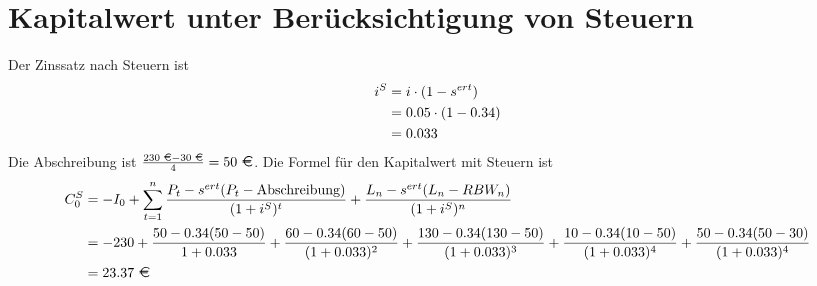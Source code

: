 \documentclass{article}
\begin{document}
	\section*{Kapitalwert unter Berücksichtigung von Steuern}
	Der Zinssatz nach Steuern ist
	\begin{align}
		i^S &= i\cdot (1-s^{ert}) \notag \\
		&= 0.05 \cdot (1-0.34) \notag \\
		&= 0.033 \notag
	\end{align}
	Die Abschreibung ist $\frac{230\text{ \EUR} - 30\text{ \EUR}}{4} = 50\text{ \EUR}$. Die Formel für den Kapitalwert mit Steuern ist
	\begin{align}
		C_0^S &= -I_0 + \sum_{t=1}^{n} \frac{P_t-s^{ert}(P_t-\text{Abschreibung})}{(1+i^S)^t} + \frac{L_n-s^{ert}(L_n-RBW_n)}{(1+i^S)^n} \notag \\
		&= -230 + \frac{50-0.34(50-50)}{1+0.033} + \frac{60-0.34(60-50)}{(1+0.033)^2} + \frac{130-0.34(130-50)}{(1+0.033)^3} + \frac{10-0.34(10-50)}{(1+0.033)^4} + \frac{50-0.34(50-30)}{(1+0.033)^4} \notag \\
		&= 23.37 \text{ \EUR} \notag
	\end{align}
	
\end{document}
